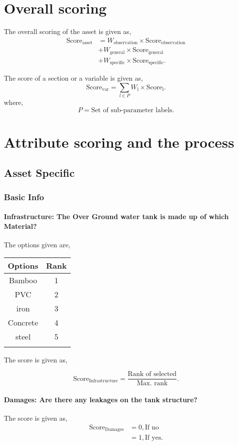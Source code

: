 \documentclass[oneside,twocolumn]{article}
\newcommand{\tsub}[2]{\text{#1}_{\text{#2}}}
\newcommand{\tsubb}[2]{#1_{\text{#2}}}
\newcommand{\dsub}[2]{\dfrac{\text{#1}}{\text{#2}}}
\newcommand{\singsel}[1]
{
	\[
		\tsub{Score}{#1} = \dsub{Rank of selected}{Max. rank}.
	\]
}
\newenvironment{ttable}
{
\begin{center}
\begin{tabular}{c|c}
\hline
}
{
\\ \hline
\end{tabular}
\end{center}
}
\begin{document}
\section{Overall scoring}
The overall scoring of the asset is given as,
\begin{align*}
	\tsub{Score}{asset} &= \tsubb{W}{observation} \times \tsub{Score}{observation} \\
	&+ \tsubb{W}{general} \times \tsub{Score}{general} \\
	&+ \tsubb{W}{specific} \times \tsub{Score}{specific}.
\end{align*}

The score of a section or a variable is given as,
\[
	\tsub{Score}{var} = \sum_{l \in P} \tsubb{W}{l} \times \tsub{Score}{l}.
\]
where,
\[
	P = \text{Set of sub-parameter labels.}
\]
\section{Attribute scoring and the
process}
\subsection{Asset Specific}
\subsubsection{Basic Info}

\paragraph{Infrastructure: 
The Over Ground water tank is made up of which Material? 
}

The options given are,
\begin{ttable}
Options & Rank \\ \hline
Bamboo & 1 \\
PVC & 2 \\
iron & 3 \\
Concrete & 4 \\
steel & 5 \\
\hline
\end{ttable}
The score is given as,
\singsel{Infrastructure}
\paragraph{Damages: 
Are there any leakages on the tank structure? 
}

The score is given as,
\begin{align*}
\tsub{Score}{Damages} &= 0, \text{If no} \\
        &= 1, \text{If yes}.
\end{align*}
\end{document}
